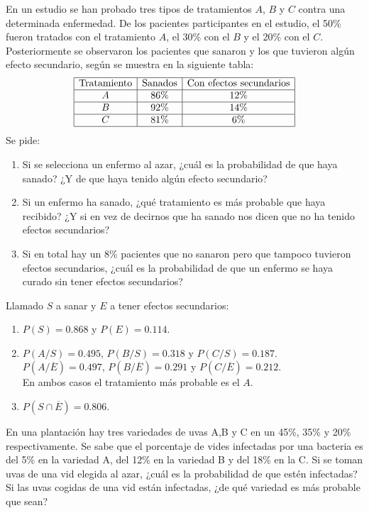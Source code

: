 {En un estudio se han probado tres tipos de tratamientos $A$, $B$ y $C$ contra una determinada enfermedad. De los
pacientes participantes en el estudio, el 50\% fueron tratados con el tratamiento $A$, el 30\% con el $B$ y el 20\% con
el $C$.
Posteriormente se observaron los pacientes que sanaron y los que tuvieron algún efecto secundario, según se
muestra en la siguiente tabla:
\[
\begin{array}{|c|c|c|c|}
\hline
\text{Tratamiento} & \text{Sanados} & \text{Con efectos secundarios} \\
\hline
A & 86\% & 12\% \\
\hline
B & 92\% & 14\% \\
\hline
C & 81\% &  6\% \\
\hline
\end{array}
\]
Se pide:
\begin{enumerate}
\item Si se selecciona un enfermo al azar, ¿cuál es la probabilidad de que haya sanado?
¿Y de que haya tenido algún efecto secundario? 
\item Si un enfermo ha sanado, ¿qué tratamiento es más probable que haya recibido?
¿Y si en vez de decirnos que ha sanado nos dicen que no ha tenido efectos secundarios?
\item Si en total hay un 8\% pacientes que no sanaron pero que tampoco tuvieron efectos secundarios, ¿cuál es la
probabilidad de que un enfermo se haya curado sin tener efectos secundarios?
\end{enumerate}
}
{Llamado $S$ a sanar y $E$ a tener efectos secundarios:
\begin{enumerate}
\item $P(S)=0.868$ y $P(E)=0.114$.
\item $P(A/S)=0.495$, $P(B/S)=0.318$ y $P(C/S)=0.187$.\\
$P(A/\overline{E})=0.497$, $P(B/\overline{E})=0.291$ y $P(C/\overline{E})=0.212$.\\
En ambos casos el tratamiento más probable es el $A$.
\item $P(S\cap \overline{E})=0.806$.
\end{enumerate}
}
{}


{En una plantación hay tres variedades de uvas A,B y C en un 45\%, 35\% y 20\% respectivamente. Se sabe que el porcentaje de vides infectadas por una bacteria es del 5\% en la variedad A, del 12\% en la variedad B y del 18\% en la C. Si se toman uvas de una vid elegida al azar, ¿cuál es la probabilidad de que estén infectadas? Si las uvas cogidas de una vid están infectadas, ¿de qué variedad es más probable que sean?
}
{}
{}


